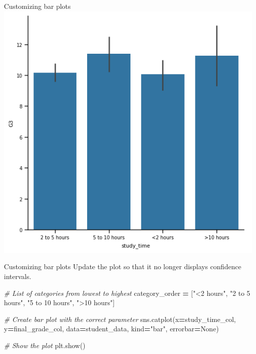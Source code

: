 \documentclass[
  ignorenonframetext,
]{beamer}
\newenvironment{Shaded}{\begin{snugshade}}{\end{snugshade}}
\newcommand{\CommentTok}[1]{\textcolor[rgb]{0.56,0.35,0.01}{\textit{#1}}}
\newcommand{\NormalTok}[1]{#1}
\newcommand{\OperatorTok}[1]{\textcolor[rgb]{0.81,0.36,0.00}{\textbf{#1}}}
\newcommand{\StringTok}[1]{\textcolor[rgb]{0.31,0.60,0.02}{#1}}
\newcommand{\VariableTok}[1]{\textcolor[rgb]{0.00,0.00,0.00}{#1}}
\begin{document}
\begin{frame}{Customizing bar plots}
\label{customizing-bar-plots-6}
\includegraphics{../images/im283.png}
\end{frame}

\begin{frame}[fragile]{Customizing bar plots}
\label{customizing-bar-plots-7}
Update the plot so that it no longer displays confidence intervals.


\begin{Shaded}
\begin{Highlighting}[]
\CommentTok{\# List of categories from lowest to highest}
\NormalTok{category\_order }\OperatorTok{=}\NormalTok{ [}\StringTok{"\textless{}2 hours"}\NormalTok{, }
                  \StringTok{"2 to 5 hours"}\NormalTok{, }
                  \StringTok{"5 to 10 hours"}\NormalTok{, }
                  \StringTok{"\textgreater{}10 hours"}\NormalTok{]}

\CommentTok{\# Create bar plot with the correct parameter}
\NormalTok{sns.catplot(x}\OperatorTok{=}\NormalTok{study\_time\_col, y}\OperatorTok{=}\NormalTok{final\_grade\_col, }
\NormalTok{            data}\OperatorTok{=}\NormalTok{student\_data, kind}\OperatorTok{=}\StringTok{"bar"}\NormalTok{, errorbar}\OperatorTok{=}\VariableTok{None}\NormalTok{)}

\CommentTok{\# Show the plot}
\NormalTok{plt.show()}
\end{Highlighting}
\end{Shaded}
\end{frame}
\end{document}
